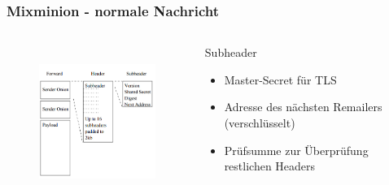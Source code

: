 \documentclass{beamer}
\begin{document}
\begin{frame}
	\frametitle{Mixminion - normale Nachricht}

	\begin{columns}[T]
		\begin{column}{5cm}
			\begin{figure}
				\centering
				\includegraphics[height=5cm]{bilder/mixminion_standard.jpg}
			\end{figure}
		\end{column}
		\begin{column}{5cm}
			\begin{block}{Subheader}	
				\begin{itemize}	
					\item Master-Secret für TLS
					\item Adresse des nächsten Remailers (verschlüsselt)
					\item Prüfsumme zur Überprüfung restlichen Headers
				\end{itemize}
			\end{block}
		\end{column}
	\end{columns}
\end{frame}
\end{document}
